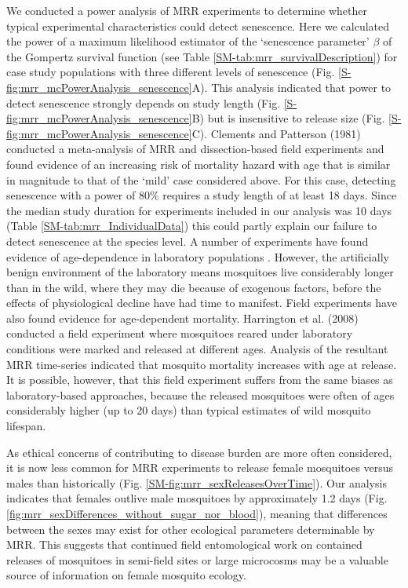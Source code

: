 \documentclass[]{article}
\begin{document}
We conducted a power analysis of MRR experiments to determine
whether typical experimental characteristics could detect senescence.
Here we calculated the power of a maximum likelihood estimator of the
`senescence parameter' $\beta$ of the Gompertz survival function (see Table
\ref{SM-tab:mrr_survivalDescription}) for case study populations with three different levels of
senescence (Fig. \ref{S-fig:mrr_mcPowerAnalysis_senescence}A). This analysis indicated that power to detect
senescence strongly depends on study length (Fig. \ref{S-fig:mrr_mcPowerAnalysis_senescence}B) but is
insensitive to release size (Fig. \ref{S-fig:mrr_mcPowerAnalysis_senescence}C). Clements and Patterson (1981)
conducted a meta-analysis of MRR and dissection-based field experiments
and found evidence of an increasing risk of mortality hazard with age
that is similar in magnitude to that of the `mild' case considered
above. For this case, detecting senescence with a power of 80\% requires
a study length of at least 18 days. Since the median study duration for
experiments included in our analysis was 10 days (Table \ref{SM-tab:mrr_IndividualData}) this could
partly explain our failure to detect senescence at the species level. A
number of experiments have found evidence of age-dependence in
laboratory populations \citep{styer2007mosquitoes,dawes2009anopheles}.
However, the artificially benign environment of the laboratory means
mosquitoes live considerably longer than in the wild, where they may die
because of exogenous factors, before the effects of physiological
decline have had time to manifest. Field experiments have also found
evidence for age-dependent mortality. Harrington et al. (2008) conducted
a field experiment where mosquitoes reared under laboratory conditions
were marked and released at different ages. Analysis of the resultant
MRR time-series indicated that mosquito mortality increases with age at
release. It is possible, however, that this field experiment suffers
from the same biases as laboratory-based approaches, because the
released mosquitoes were often of ages considerably higher (up to 20
days) than typical estimates of wild mosquito lifespan.

As ethical concerns of contributing to disease burden are more often
considered, it is now less common for MRR experiments to release female
mosquitoes versus males than historically (Fig. \ref{SM-fig:mrr_sexReleasesOverTime}). Our analysis
indicates that females outlive male mosquitoes by approximately 1.2 days
(Fig. \ref{fig:mrr_sexDifferences_without_sugar_nor_blood}), meaning that differences between the sexes may exist for
other ecological parameters determinable by MRR. This suggests that
continued field entomological work on contained releases of mosquitoes
in semi-field sites or large microcosms may be a valuable source of
information on female mosquito ecology.
\end{document}
